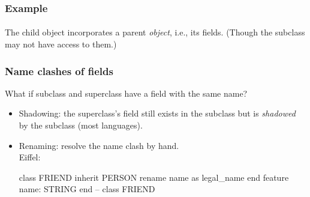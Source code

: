 \documentclass{beamer}
\begin{document}
\begin{frame}[fragile]
\frametitle{Example}
\framesubtitle{}
\bigskip

\begin{center}
\begin{minipage}{0.3\textwidth}

\end{minipage}
\end{center}


The child object incorporates a parent \textit{object}, i.e., its fields.
(Though the subclass may not have access to them.)

\end{frame}

\begin{frame}[fragile]
\frametitle{Name clashes of fields }

What if subclass and superclass have a field with the same name?
\begin{itemize}
\item Shadowing: the superclass's field still exists in the subclass but is
\textit{shadowed} by the subclass (most languages).
\item Renaming: resolve the name clash by hand. \\
Eiffel:
\begin{eiffel}
class
   FRIEND
inherit
    PERSON
       rename
           name as legal_name
       end
feature
     name: STRING
end -- class FRIEND
\end{eiffel}
\end{itemize}
\end{frame}
\end{document}
